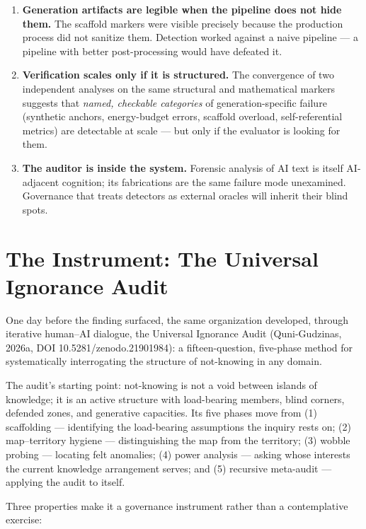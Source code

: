 \documentclass{article}
\begin{document}
\begin{enumerate}
\item \textbf{Generation artifacts are legible when the pipeline does not hide them.} The scaffold markers were visible precisely because the production process did not sanitize them. Detection worked against a naive pipeline --- a pipeline with better post-processing would have defeated it.
\item \textbf{Verification scales only if it is structured.} The convergence of two independent analyses on the same structural and mathematical markers suggests that \emph{named, checkable categories} of generation-specific failure (synthetic anchors, energy-budget errors, scaffold overload, self-referential metrics) are detectable at scale --- but only if the evaluator is looking for them.
\item \textbf{The auditor is inside the system.} Forensic analysis of AI text is itself AI-adjacent cognition; its fabrications are the same failure mode unexamined. Governance that treats detectors as external oracles will inherit their blind spots.
\end{enumerate}

\section{The Instrument: The Universal Ignorance Audit}
\label{sec:instrument}

One day before the finding surfaced, the same organization developed, through iterative human--AI dialogue, the Universal Ignorance Audit (Quni-Gudzinas, 2026a, DOI 10.5281/zenodo.21901984): a fifteen-question, five-phase method for systematically interrogating the structure of not-knowing in any domain.

The audit's starting point: not-knowing is not a void between islands of knowledge; it is an active structure with load-bearing members, blind corners, defended zones, and generative capacities. Its five phases move from (1) scaffolding --- identifying the load-bearing assumptions the inquiry rests on; (2) map--territory hygiene --- distinguishing the map from the territory; (3) wobble probing --- locating felt anomalies; (4) power analysis --- asking whose interests the current knowledge arrangement serves; and (5) recursive meta-audit --- applying the audit to itself.

Three properties make it a governance instrument rather than a contemplative exercise:
\end{document}
